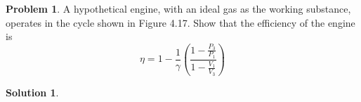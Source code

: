 \documentclass[10pt]{article}
\theoremstyle{definition}
\newtheorem{problem}{Problem}
\newtheorem{soln}{Solution}
\begin{document}
\begin{problem}
A hypothetical engine, with an ideal gas as the working substance,
operates in the cycle shown in Figure 4.17. Show that the efficiency of
the engine is
$$\eta=1-\frac{1}{\gamma}\left(\frac{1-\frac{P_3}{P_1}}{1-\frac{V_1}{V_3}}\right)$$
\end{problem}
\begin{soln}
\end{soln}
\end{document}

